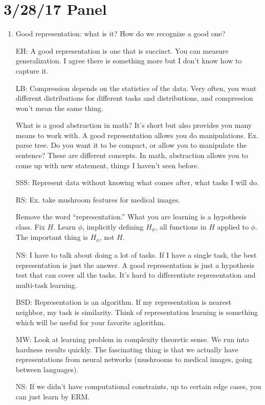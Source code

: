 \section{3/28/17 Panel}

\begin{enumerate}
\item
Good representation: what is it? How do we recognize a good one?

EH: A good representation is one that is succinct. You can measure generalization. I agree there is something more but I don't know how to capture it.

LB: Compression depends on the statistics of the data. Very often, you want different distributions for different tasks and distributions, and compression won't mean the same thing.

What is a good abstraction in math? It's short but also provides you many means to work with. A good representation allows you do manipulations. Ex. parse tree. Do you want it to be compact, or allow you to manipulate the sentence? These are different concepts. In math, abstraction allows you to come up with new statement, things I haven't seen before.

SSS: Represent data without knowing what comes after, what tasks I will do. 

RS: Ex. take mushroom features for medical images.

Remove the word ``representation.'' What you are learning is a hypothesis class. Fix $H$. Learn $\phi$, implicitly defining $H_\phi$, all functions in $H$ applied to $\phi$. The important thing is $H_\phi$, not $H$. 

NS: I have to talk about doing a lot of tasks. If I have a single task, the best representation is just the answer. A good representation is just a hypothesis test that can cover all the tasks. It's hard to differentiate representation and multi-task learning.

BSD: Representation is an algorithm. If my representation is nearest neighbor, my task is similarity. Think of representation learning is something which will be useful for your favorite aglorithm.

MW: Look at learning problem in complexity theoretic sense. We run into hardness results quickly. The fascinating thing is that we actually have representations from neural networks (mushrooms to medical images, going between languages).

NS: If we didn't have computational constraints, up to certain edge cases, you can just learn by ERM.


\end{enumerate}

